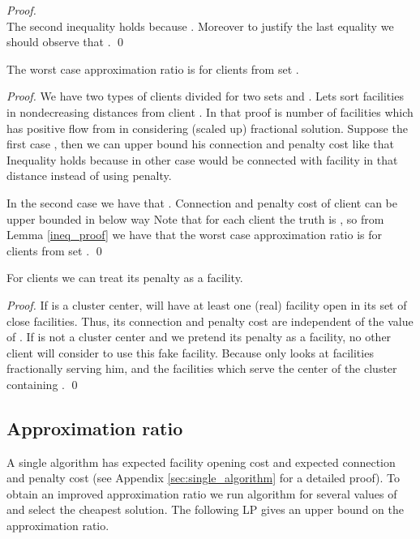 \documentclass{llncs}
\begin{document}
\begin{proof}
   
 \\The second inequality holds because . Moreover to justify the last equality we should observe that .
 \qed
\end{proof}

\begin{lemma}
 \label{worst_case}
 The worst case approximation ratio is for clients from set .
\end{lemma}

\begin{proof}
 We have two types of clients divided for two sets  and . Lets sort facilities in nondecreasing distances from client . In that proof  is number of facilities which has positive flow from  in considering (scaled up) fractional solution. Suppose the first case , then we can upper bound his connection and penalty cost like that 
     Inequality holds because  in other case  would be connected with facility in that distance instead of using penalty.
 
 In the second case we have that . Connection and penalty cost of client  can be upper bounded in below way
  Note that for each client  the truth is , so from Lemma \ref{ineq_proof} we have that the worst case approximation ratio is for clients from set .
 \qed
\end{proof}

\begin{lemma}
 \label{g_0}
 For clients  we can treat its penalty as a facility.
\end{lemma}

\begin{proof}
If  is a cluster center,  will have at least one (real) facility open in {its} set of close facilities. Thus, its connection and penalty cost are independent of the value of . If  is not a cluster center and we pretend
its penalty as a facility, no other client  will consider to use this fake facility. Because  only looks at facilities
fractionally serving him, and the facilities which serve the center of the cluster containing .
\qed
\end{proof}

\subsection{Approximation ratio}
\label{group_analize}

A single algorithm  has expected facility opening cost  and expected connection and penalty cost  (see Appendix \ref{sec:single_algorithm} for a detailed proof). To obtain an improved approximation ratio we run algorithm  for several values of  and select the cheapest solution. The following LP gives an upper bound on the approximation ratio.
\end{document}
